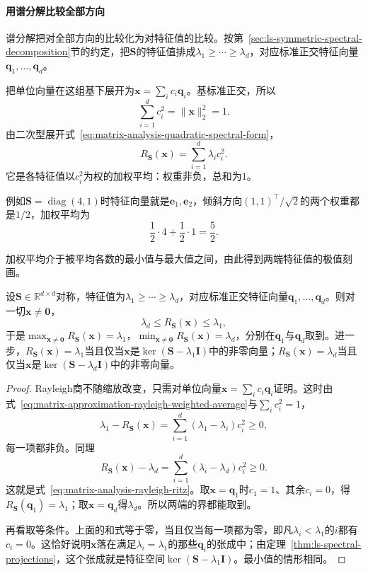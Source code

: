 \paragraph{用谱分解比较全部方向}
谱分解把对全部方向的比较化为对特征值的比较。按第~\ref{sec:ls-symmetric-spectral-decomposition}节的约定，把$\bm S$的特征值排成$\lambda_1\geq\cdots\geq\lambda_d$，对应标准正交特征向量$\bm q_1,\ldots,\bm q_d$。

把单位向量在这组基下展开为$\bm x=\sum_ic_i\bm q_i$。基标准正交，所以
\[
 \sum_{i=1}^dc_i^2=\lVert\bm x\rVert_2^2=1 .
\]
由二次型展开式~\eqref{eq:matrix-analysis-quadratic-spectral-form}，
\begin{equation}
 R_{\bm S}(\bm x)=\sum_{i=1}^d\lambda_ic_i^2 .
 \label{eq:matrix-approximation-rayleigh-weighted-average}
\end{equation}
它是各特征值以$c_i^2$为权的加权平均：权重非负，总和为$1$。

例如$\bm S=\operatorname{diag}(4,1)$时特征向量就是$\bm e_1,\bm e_2$，倾斜方向$(1,1)^\top/\sqrt2$的两个权重都是$1/2$，加权平均为
\[
 \frac12\cdot4+\frac12\cdot1=\frac52 .
\]

加权平均介于被平均各数的最小值与最大值之间，由此得到两端特征值的极值刻画。

\begin{theorem}
\label{thm:matrix-analysis-rayleigh-ritz}
设$\bm S\in\mathbb R^{d\times d}$对称，特征值为$\lambda_1\geq\cdots\geq\lambda_d$，对应标准正交特征向量$\bm q_1,\ldots,\bm q_d$。则对一切$\bm x\neq\bm0$，
\begin{equation}
 \lambda_d\leq R_{\bm S}(\bm x)\leq\lambda_1 ,
 \label{eq:matrix-analysis-rayleigh-ritz}
\end{equation}
于是$\max_{\bm x\neq\bm0}R_{\bm S}(\bm x)=\lambda_1$，$\min_{\bm x\neq\bm0}R_{\bm S}(\bm x)=\lambda_d$，分别在$\bm q_1$与$\bm q_d$取到。进一步，$R_{\bm S}(\bm x)=\lambda_1$当且仅当$\bm x$是$\ker(\bm S-\lambda_1\bm I)$中的非零向量；$R_{\bm S}(\bm x)=\lambda_d$当且仅当$\bm x$是$\ker(\bm S-\lambda_d\bm I)$中的非零向量。
\end{theorem}
\begin{proof}
Rayleigh商不随缩放改变，只需对单位向量$\bm x=\sum_ic_i\bm q_i$证明。这时由式~\eqref{eq:matrix-approximation-rayleigh-weighted-average}与$\sum_ic_i^2=1$，
\[
 \lambda_1-R_{\bm S}(\bm x)=\sum_{i=1}^d(\lambda_1-\lambda_i)c_i^2\geq0 ,
\]
每一项都非负。同理
\[
 R_{\bm S}(\bm x)-\lambda_d=\sum_{i=1}^d(\lambda_i-\lambda_d)c_i^2\geq0 .
\]
这就是式~\eqref{eq:matrix-analysis-rayleigh-ritz}。取$\bm x=\bm q_1$时$c_1=1$、其余$c_i=0$，得$R_{\bm S}(\bm q_1)=\lambda_1$；取$\bm x=\bm q_d$得$\lambda_d$。所以两端的界都能取到。

再看取等条件。上面的和式等于零，当且仅当每一项都为零，即凡$\lambda_i<\lambda_1$的$i$都有$c_i=0$。这恰好说明$\bm x$落在满足$\lambda_i=\lambda_1$的那些$\bm q_i$的张成中；由定理~\ref{thm:ls-spectral-projections}，这个张成就是特征空间$\ker(\bm S-\lambda_1\bm I)$。最小值的情形相同。
\end{proof}

